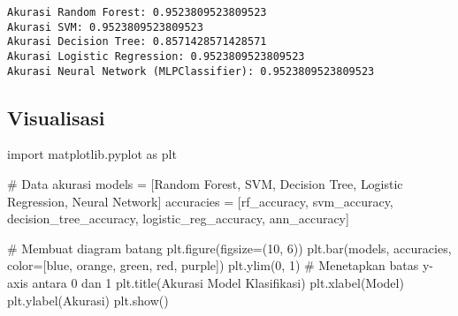 \documentclass[
  letterpaper,
]{krantz}
\makeatletter
\newenvironment{Shaded}{\begin{snugshade}}{\end{snugshade}}
\newcommand{\CommentTok}[1]{\textcolor[rgb]{0.37,0.37,0.37}{#1}}
\newcommand{\DecValTok}[1]{\textcolor[rgb]{0.68,0.00,0.00}{#1}}
\newcommand{\ImportTok}[1]{\textcolor[rgb]{0.00,0.46,0.62}{#1}}
\newcommand{\NormalTok}[1]{\textcolor[rgb]{0.00,0.23,0.31}{#1}}
\newcommand{\OperatorTok}[1]{\textcolor[rgb]{0.37,0.37,0.37}{#1}}
\newcommand{\StringTok}[1]{\textcolor[rgb]{0.13,0.47,0.30}{#1}}
\newenvironment{kframe}{%
\medskip{}
\setlength{\fboxsep}{.8em}
 \def\at@end@of@kframe{}%
 \ifinner\ifhmode%
  \def\at@end@of@kframe{\end{minipage}}%
  \begin{minipage}{\columnwidth}%
 \fi\fi%
 \def\FrameCommand##1{\hskip\@totalleftmargin \hskip-\fboxsep
 \colorbox{shadecolor}{##1}\hskip-\fboxsep
     \hskip-\linewidth \hskip-\@totalleftmargin \hskip\columnwidth}%
 \MakeFramed {\advance\hsize-\width
   \@totalleftmargin\z@ \linewidth\hsize
   \@setminipage}}%
 {\par\unskip\endMakeFramed%
 \at@end@of@kframe}
\renewenvironment{Shaded}{\begin{kframe}}{\end{kframe}}
\makeatother
\begin{document}
\begin{verbatim}
Akurasi Random Forest: 0.9523809523809523
Akurasi SVM: 0.9523809523809523
Akurasi Decision Tree: 0.8571428571428571
Akurasi Logistic Regression: 0.9523809523809523
Akurasi Neural Network (MLPClassifier): 0.9523809523809523
\end{verbatim}

\hypertarget{visualisasi-1}{%
\subsection{Visualisasi}\label{visualisasi-1}}

\begin{Shaded}
\begin{Highlighting}[]
\ImportTok{import}\NormalTok{ matplotlib.pyplot }\ImportTok{as}\NormalTok{ plt}

\CommentTok{\# Data akurasi}
\NormalTok{models }\OperatorTok{=}\NormalTok{ [}\StringTok{\textquotesingle{}Random Forest\textquotesingle{}}\NormalTok{, }\StringTok{\textquotesingle{}SVM\textquotesingle{}}\NormalTok{, }\StringTok{\textquotesingle{}Decision Tree\textquotesingle{}}\NormalTok{, }\StringTok{\textquotesingle{}Logistic Regression\textquotesingle{}}\NormalTok{, }\StringTok{\textquotesingle{}Neural Network\textquotesingle{}}\NormalTok{]}
\NormalTok{accuracies }\OperatorTok{=}\NormalTok{ [rf\_accuracy, svm\_accuracy, decision\_tree\_accuracy, logistic\_reg\_accuracy, ann\_accuracy]}

\CommentTok{\# Membuat diagram batang}
\NormalTok{plt.figure(figsize}\OperatorTok{=}\NormalTok{(}\DecValTok{10}\NormalTok{, }\DecValTok{6}\NormalTok{))}
\NormalTok{plt.bar(models, accuracies, color}\OperatorTok{=}\NormalTok{[}\StringTok{\textquotesingle{}blue\textquotesingle{}}\NormalTok{, }\StringTok{\textquotesingle{}orange\textquotesingle{}}\NormalTok{, }\StringTok{\textquotesingle{}green\textquotesingle{}}\NormalTok{, }\StringTok{\textquotesingle{}red\textquotesingle{}}\NormalTok{, }\StringTok{\textquotesingle{}purple\textquotesingle{}}\NormalTok{])}
\NormalTok{plt.ylim(}\DecValTok{0}\NormalTok{, }\DecValTok{1}\NormalTok{)  }\CommentTok{\# Menetapkan batas y{-}axis antara 0 dan 1}
\NormalTok{plt.title(}\StringTok{\textquotesingle{}Akurasi Model Klasifikasi\textquotesingle{}}\NormalTok{)}
\NormalTok{plt.xlabel(}\StringTok{\textquotesingle{}Model\textquotesingle{}}\NormalTok{)}
\NormalTok{plt.ylabel(}\StringTok{\textquotesingle{}Akurasi\textquotesingle{}}\NormalTok{)}
\NormalTok{plt.show()}
\end{Highlighting}
\end{Shaded}
\end{document}
